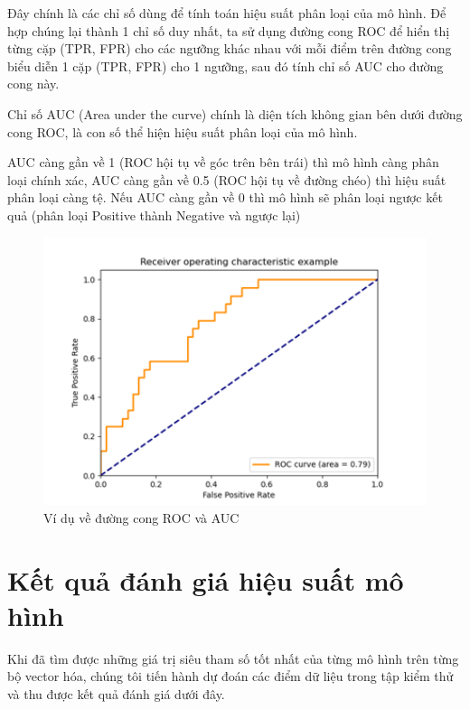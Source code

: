 \documentclass[12pt,a4paper,oneside]{book}
\begin{document}
	Đây chính là các chỉ số dùng để tính toán hiệu suất phân loại của mô hình. Để hợp chúng lại thành 1 chỉ số duy nhất, ta sử dụng đường cong ROC để hiển thị từng cặp (TPR, FPR) cho các ngưỡng khác nhau với mỗi điểm trên đường cong biểu diễn 1 cặp (TPR, FPR) cho 1 ngưỡng, sau đó tính chỉ số AUC cho đường cong này. 
	
	Chỉ số AUC (Area under the curve) chính là diện tích không gian bên dưới đường cong ROC, là con số thể hiện hiệu suất phân loại của mô hình. 
	
	AUC càng gần về 1 (ROC hội tụ về góc trên bên trái) thì mô hình càng phân loại chính xác, AUC càng gần về 0.5 (ROC hội tụ về đường chéo) thì hiệu suất phân loại càng tệ. Nếu AUC càng gần về 0 thì mô hình sẽ phân loại ngược kết quả (phân loại Positive thành Negative và ngược lại)
	
			\begin{figure}[H]
				\centering
				\includegraphics[width=1\textwidth]{roc_auc}
				\caption{Ví dụ về đường cong ROC và AUC}
			\end{figure}
	
	\pagebreak
	\section{Kết quả đánh giá hiệu suất mô hình}
		Khi đã tìm được những giá trị siêu tham số tốt nhất của từng mô hình trên từng bộ vector hóa, chúng tôi tiến hành dự đoán các điểm dữ liệu trong tập kiểm thử và thu được kết quả đánh giá dưới đây.
\end{document}
